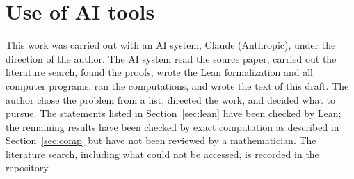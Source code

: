 \documentclass[12pt]{article}
\theoremstyle{plain}
\theoremstyle{remark}
\begin{document}
\section{Use of AI tools}\label{sec:ai}

This work was carried out with an AI system, Claude (Anthropic), under the direction of the
author. The AI system read the source paper, carried out the literature search, found the
proofs, wrote the Lean formalization and all computer programs, ran the computations, and wrote
the text of this draft. The author chose the problem from a list, directed the work, and
decided what to pursue. The statements listed in Section~\ref{sec:lean} have been checked by
Lean; the remaining results have been checked by exact computation as described in
Section~\ref{sec:comp} but have not been reviewed by a mathematician. The literature search,
including what could not be accessed, is recorded in the repository.
\end{document}
